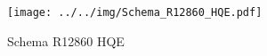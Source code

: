 \begin{figure}[h]\centering\texttt{[image: ../../img/Schema\_R12860\_HQE.pdf]}\caption{Schema R12860 HQE}\label{fig:Schema_R12860_HQE}\end{figure}
